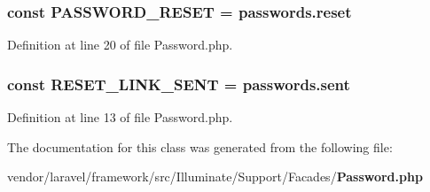 \subsubsection[{P\+A\+S\+S\+W\+O\+R\+D\+\_\+\+R\+E\+S\+E\+T}]{\setlength{\rightskip}{0pt plus 5cm}const P\+A\+S\+S\+W\+O\+R\+D\+\_\+\+R\+E\+S\+E\+T = \textquotesingle{}passwords.\+reset\textquotesingle{}}\label{class_illuminate_1_1_support_1_1_facades_1_1_password_aa813e80ea77942e10fca4a13703a9656}


Definition at line 20 of file Password.\+php.

\subsubsection[{R\+E\+S\+E\+T\+\_\+\+L\+I\+N\+K\+\_\+\+S\+E\+N\+T}]{\setlength{\rightskip}{0pt plus 5cm}const R\+E\+S\+E\+T\+\_\+\+L\+I\+N\+K\+\_\+\+S\+E\+N\+T = \textquotesingle{}passwords.\+sent\textquotesingle{}}\label{class_illuminate_1_1_support_1_1_facades_1_1_password_accc26b0866bade0a2169537aa93e465a}


Definition at line 13 of file Password.\+php.



The documentation for this class was generated from the following file\+:\begin{DoxyCompactItemize}
\item 
vendor/laravel/framework/src/\+Illuminate/\+Support/\+Facades/{\bf Password.\+php}\end{DoxyCompactItemize}
